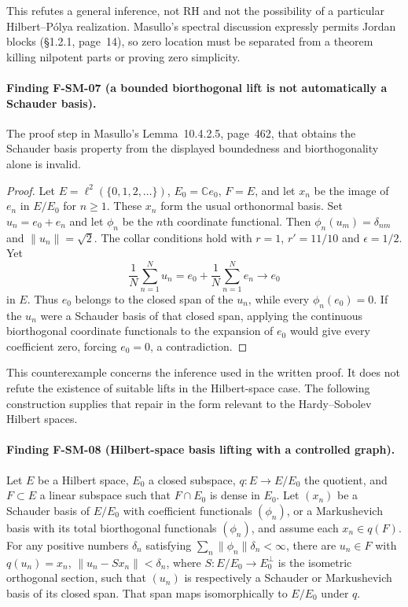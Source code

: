 \documentclass[11pt,a4paper]{article}
\theoremstyle{definition}\newtheorem{definition}[theorem]{Definition}
\theoremstyle{remark}\newtheorem{remark}[theorem]{Remark}
\begin{document}
This refutes a general inference, not RH and not the possibility of a
particular Hilbert--P\'olya realization.  Masullo's spectral discussion
expressly permits Jordan blocks (\S1.2.1, page~14), so zero location
must be separated from a theorem killing nilpotent parts or proving
zero simplicity.

\paragraph{Finding F-SM-07 (a bounded biorthogonal lift is not automatically
a Schauder basis).}
The proof step in Masullo's Lemma~10.4.2.5, page~462, that obtains
the Schauder basis property from the displayed boundedness and
biorthogonality alone is invalid.

\begin{proof}
Let $E=\ell^2(\{0,1,2,\ldots\})$, $E_0=\mathbb Ce_0$, $F=E$,
and let $x_n$ be the image of $e_n$ in $E/E_0$ for $n\geq1$.
These $x_n$ form the usual orthonormal basis.  Set $u_n=e_0+e_n$
and let $\phi_n$ be the $n$th coordinate functional.  Then
$\phi_n(u_m)=\delta_{nm}$ and $\|u_n\|=\sqrt2$.
The collar conditions hold with $r=1$, $r'=11/10$ and $\epsilon=1/2$.
Yet
\[
 \frac1N\sum_{n=1}^{N}u_n
   =e_0+\frac1N\sum_{n=1}^{N}e_n\longrightarrow e_0
\]
in $E$.  Thus $e_0$ belongs to the closed span of the $u_n$, while
every $\phi_n(e_0)=0$.  If the $u_n$ were a Schauder basis of that
closed span, applying the continuous biorthogonal coordinate functionals
to the expansion of $e_0$ would give every coefficient zero, forcing
$e_0=0$, a contradiction.
\end{proof}

This counterexample concerns the inference used in the written proof.
It does not refute the existence of suitable lifts in the Hilbert-space
case.  The following construction supplies that repair in the form relevant
to the Hardy--Sobolev Hilbert spaces.

\paragraph{Finding F-SM-08 (Hilbert-space basis lifting with a controlled
graph).}
Let $E$ be a Hilbert space, $E_0$ a closed subspace, $q:E\to E/E_0$ the
quotient, and $F\subset E$ a linear subspace such that $F\cap E_0$ is
dense in $E_0$.  Let $(x_n)$ be a Schauder basis of $E/E_0$ with
coefficient functionals $(\phi_n)$, or a Markushevich basis with
its total biorthogonal functionals $(\phi_n)$, and assume each
$x_n\in q(F)$.
For any positive numbers $\delta_n$ satisfying
$\sum_n\|\phi_n\|\delta_n<\infty$, there are $u_n\in F$ with
$q(u_n)=x_n$, $\|u_n-Sx_n\|<\delta_n$, where
$S:E/E_0\to E_0^\perp$ is the isometric orthogonal section, such that
$(u_n)$ is respectively a Schauder or Markushevich basis of its closed span.
That span maps
isomorphically to $E/E_0$ under $q$.
\end{document}
